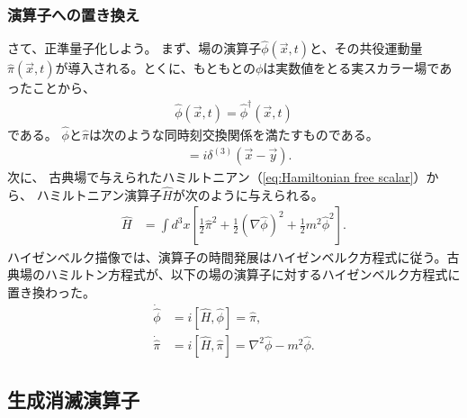 \documentclass[10pt,a4paper]{jarticle}
\begin{document}
\subsubsection{演算子への置き換え}
さて、正準量子化しよう。
まず、場の演算子$\hat\phi(\vec x,t)$と、その共役運動量$\hat\pi(\vec x ,t)$が導入される。とくに、もともとの$\phi$は実数値をとる実スカラー場であったことから、
\begin{align}
\hat\phi(\vec x,t) = \hat\phi^\dagger(\vec x,t)
\end{align}
である。
$\hat\phi$と$\hat\pi$は次のような同時刻交換関係を満たすものである。
\begin{align}
[\hat\phi(t,\vec x), \hat\pi(t,\vec y)] &= i\delta^{(3)}(\vec x - \vec y).
\end{align}
%
次に、
古典場で与えられたハミルトニアン（\ref{eq:Hamiltonian free scalar}）から、
ハミルトニアン演算子$\hat H$が次のように与えられる。
\begin{align}
\hat H &= \int d^3x \left[ \frac{1}{2} \hat\pi^2 + \frac{1}{2}(\nabla\hat\phi)^2 + \frac{1}{2} m^2 \hat\phi^2 \right].
\end{align}
%
ハイゼンベルク描像では、演算子の時間発展はハイゼンベルク方程式に従う。古典場のハミルトン方程式が、以下の場の演算子に対するハイゼンベルク方程式に置き換わった。
\begin{align}
\dot{\hat \phi} &= i[\hat H, \hat\phi] = \hat\pi, \\
\dot{\hat \pi} &= i[\hat H, \hat\pi] = \nabla^2\hat\phi - m^2 \hat\phi.
\end{align}



\subsection{生成消滅演算子}
\end{document}

